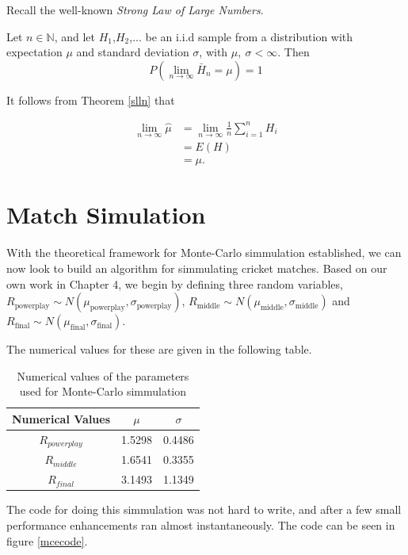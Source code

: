 Recall the well-known \textit{Strong Law of Large Numbers}.

\begin{theorem}
    \label{slln}
    Let $n \in \mathbb{N}$, and let $H_1$,$H_2$,... be an i.i.d sample from a distribution with expectation $\mu$ and standard deviation $\sigma$, with $\mu, \ \sigma < \infty$.
    Then 
    $$ 
        P\left( \lim_{n \to \infty} \bar{H}_n = \mu \right) = 1
    $$
\end{theorem}

It follows from Theorem \ref{slln} that

\begin{align}
\lim_{n \to \infty} \hat{\mu} &= \lim_{n \to \infty} \frac{1}{n}\sum_{i=1}^nH_i \\
                              &= E(H) \\
                              &= \mu.
\end{align}

\section{Match Simulation}
With the theoretical framework for Monte-Carlo simmulation established, we can now look to build an algorithm for simmulating cricket matches. Based on our own work in Chapter 4, 
we begin by defining three random variables, $R_{\text{powerplay}} \sim N(\mu_{\text{powerplay}},\sigma_\text{powerplay})$, $R_{\text{middle}} \sim N(\mu_{\text{middle}},\sigma_{\text{middle}})$
and $R_{\text{final}} \sim N(\mu_{\text{final}},\sigma_{\text{final}})$.

The numerical values for these are given in the following table.

\begin{table}[h]
    \centering
    \begin{tabular}{c | c | c}
        Numerical Values & $\mu$ & $\sigma$ \\
        \hline
        $R_{powerplay}$ & 1.5298 & 0.4486 \\
        $R_{middle}$ & 1.6541 & 0.3355 \\
        $R_{final}$ & 3.1493 & 1.1349 
    \end{tabular}
    \caption{Numerical values of the parameters used for Monte-Carlo simmulation}
\end{table}

The code for doing this simmulation was not hard to write, and after a few small performance enhancements ran almost instantaneously. The code can be seen in figure \ref{mcecode}.

